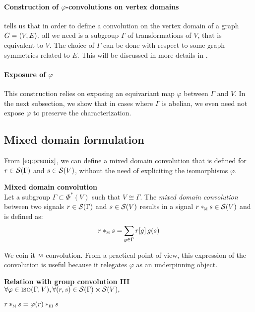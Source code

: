 \paragraph{Construction of $\varphi$-convolutions on vertex domains}
 tells us that in order to define a convolution on the vertex domain of a graph $\gve$, all we need is a subgroup $\Gamma$ of transformations of $V$, that is equivalent to $V$. The choice of $\Gamma$ can be done with respect to some graph symmetries related to $E$. This will be discussed in more details in .

\paragraph{Exposure of $\varphi$}
This construction relies on exposing an equivariant map $\varphi$ between $\Gamma$ and $V$. In the next subsection, we show that in cases where $\Gamma$ is abelian, we even need not expose $\varphi$ to preserve the characterization.

\subsection{Mixed domain formulation}

From $\eqref{eq:premix}$, we can define a mixed domain convolution \ie that is defined for $r \in \cs(\Gamma)$ and $s \in \cs(V)$, without the need of expliciting the isomorphisms $\varphi$.

\begin{definition}\textbf{Mixed domain convolution}\\
Let a subgroup $\Gamma \subset \Phi^*(V)$ such that $V \cong \Gamma$.
The \emph{mixed domain convolution} between two signals $r \in \cs(\Gamma)$ and $s \in \cs(V)$ results in a signal $r \ast_{\M} s \in \cs(V)$ and is defined as:
\begin{gather*}
r \ast_{\M} s = \displaystyle \sum_{g \in \Gamma} r[g] \h{2} g(s)
\end{gather*}
\label{def:convm}
\end{definition}

We coin it $\M$-convolution. From a practical point of view, this expression of the convolution is useful because it relegates $\varphi$ as an underpinning object.%

\begin{lemma}\textbf{Relation with group convolution III}\\
$\forall \varphi \in \iso(\Gamma, V), \forall (r,s) \in \cs(\Gamma) \times \cs(V),$\\
\centerline{$r \ast_{\M} s = \varphi(r) \ast_{\III} s$}
\label{lem:rel3m}
\end{lemma}

